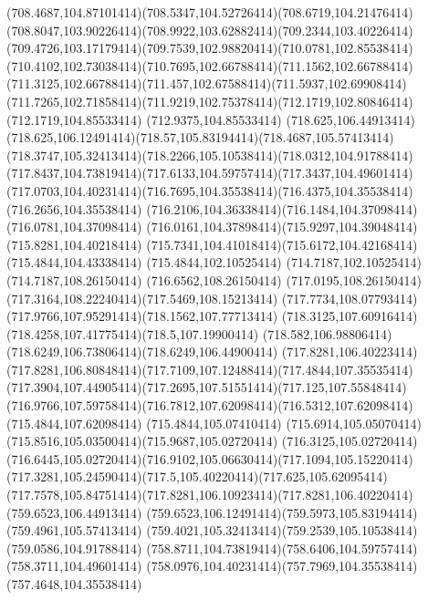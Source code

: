 {{	\curveto(708.4687,104.87101414)(708.5347,104.52726414)(708.6719,104.21476414)
	\curveto(708.8047,103.90226414)(708.9922,103.62882414)(709.2344,103.40226414)
	\curveto(709.4726,103.17179414)(709.7539,102.98820414)(710.0781,102.85538414)
	\curveto(710.4102,102.73038414)(710.7695,102.66788414)(711.1562,102.66788414)
	\curveto(711.3125,102.66788414)(711.457,102.67588414)(711.5937,102.69908414)
	\curveto(711.7265,102.71858414)(711.9219,102.75378414)(712.1719,102.80846414)
	\lineto(712.1719,104.85533414)
	\lineto(712.9375,104.85533414)
	\closepath
	\moveto(718.625,106.44913414)
	\curveto(718.625,106.12491414)(718.57,105.83194414)(718.4687,105.57413414)
	\curveto(718.3747,105.32413414)(718.2266,105.10538414)(718.0312,104.91788414)
	\curveto(717.8437,104.73819414)(717.6133,104.59757414)(717.3437,104.49601414)
	\curveto(717.0703,104.40231414)(716.7695,104.35538414)(716.4375,104.35538414)
	\lineto(716.2656,104.35538414)
	\curveto(716.2106,104.36338414)(716.1484,104.37098414)(716.0781,104.37098414)
	\curveto(716.0161,104.37898414)(715.9297,104.39048414)(715.8281,104.40218414)
	\curveto(715.7341,104.41018414)(715.6172,104.42168414)(715.4844,104.43338414)
	\lineto(715.4844,102.10525414)
	\lineto(714.7187,102.10525414)
	\lineto(714.7187,108.26150414)
	\lineto(716.6562,108.26150414)
	\curveto(717.0195,108.26150414)(717.3164,108.22240414)(717.5469,108.15213414)
	\curveto(717.7734,108.07793414)(717.9766,107.95291414)(718.1562,107.77713414)
	\curveto(718.3125,107.60916414)(718.4258,107.41775414)(718.5,107.19900414)
	\curveto(718.582,106.98806414)(718.6249,106.73806414)(718.6249,106.44900414)
	\closepath
	\moveto(717.8281,106.40223414)
	\curveto(717.8281,106.80848414)(717.7109,107.12488414)(717.4844,107.35535414)
	\curveto(717.3904,107.44905414)(717.2695,107.51551414)(717.125,107.55848414)
	\curveto(716.9766,107.59758414)(716.7812,107.62098414)(716.5312,107.62098414)
	\lineto(715.4844,107.62098414)
	\lineto(715.4844,105.07410414)
	\curveto(715.6914,105.05070414)(715.8516,105.03500414)(715.9687,105.02720414)
	\lineto(716.3125,105.02720414)
	\curveto(716.6445,105.02720414)(716.9102,105.06630414)(717.1094,105.15220414)
	\curveto(717.3281,105.24590414)(717.5,105.40220414)(717.625,105.62095414)
	\curveto(717.7578,105.84751414)(717.8281,106.10923414)(717.8281,106.40220414)
	\closepath
	\moveto(759.6523,106.44913414)
	\curveto(759.6523,106.12491414)(759.5973,105.83194414)(759.4961,105.57413414)
	\curveto(759.4021,105.32413414)(759.2539,105.10538414)(759.0586,104.91788414)
	\curveto(758.8711,104.73819414)(758.6406,104.59757414)(758.3711,104.49601414)
	\curveto(758.0976,104.40231414)(757.7969,104.35538414)(757.4648,104.35538414)
}}
